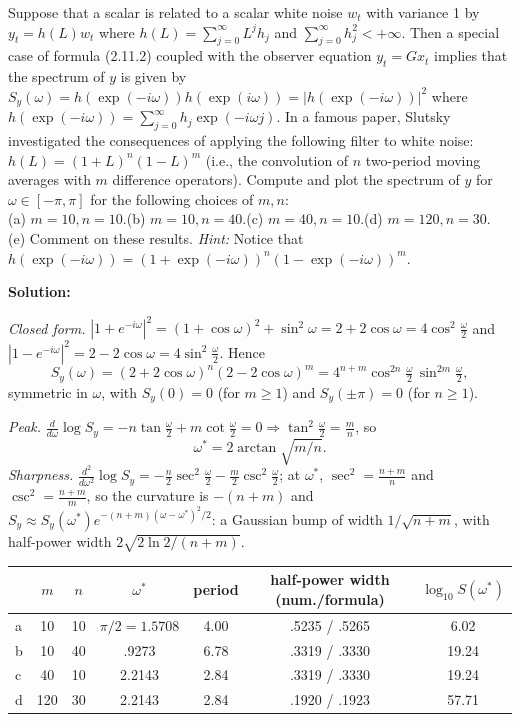 \documentclass[12pt, letterpaper]{article}
\begin{document}
\begin{tcolorbox}[oddbox,title={Exercise 2.15 \quad The Slutsky Effect}]
\begin{tcolorbox}[questionbox]
Suppose that a scalar is related to a scalar white noise $w_t$ with variance 1 by $y_t=h(L)w_t$
where $h(L)=\sum_{j=0}^\infty L^jh_j$ and $\sum_{j=0}^\infty h_j^2<+\infty$. Then a special case of
formula (2.11.2) coupled with the observer equation $y_t=Gx_t$ implies that the spectrum of $y$ is
given by $S_y(\omega)=h(\exp(-i\omega))h(\exp(i\omega))=|h(\exp(-i\omega))|^2$ where
$h(\exp(-i\omega))=\sum_{j=0}^\infty h_j\exp(-i\omega j)$. In a famous paper, Slutsky investigated the
consequences of applying the following filter to white noise: $h(L)=(1+L)^n(1-L)^m$ (i.e., the
convolution of $n$ two-period moving averages with $m$ difference operators). Compute and plot the
spectrum of $y$ for $\omega\in[-\pi,\pi]$ for the following choices of $m,n$:\\[3pt]
(a) $m=10,n=10$.\quad (b) $m=10,n=40$.\quad (c) $m=40,n=10$.\quad (d) $m=120,n=30$.\\
(e) Comment on these results.
\textit{Hint:} Notice that $h(\exp(-i\omega))=(1+\exp(-i\omega))^n(1-\exp(-i\omega))^m$.
\end{tcolorbox}

\textbf{Solution:}

\emph{Closed form.} $|1+e^{-i\omega}|^2=(1+\cos\omega)^2+\sin^2\omega=2+2\cos\omega=4\cos^2\frac\omega2$ and
$|1-e^{-i\omega}|^2=2-2\cos\omega=4\sin^2\frac\omega2$. Hence
\[
S_y(\omega)=(2+2\cos\omega)^n(2-2\cos\omega)^m=4^{n+m}\cos^{2n}\!\tfrac\omega2\,\sin^{2m}\!\tfrac\omega2,
\]
symmetric in $\omega$, with $S_y(0)=0$ (for $m\ge1$) and $S_y(\pm\pi)=0$ (for $n\ge1$).

\emph{Peak.} $\frac{d}{d\omega}\log S_y=-n\tan\frac\omega2+m\cot\frac\omega2=0\Rightarrow
\tan^2\frac{\omega}{2}=\frac mn$, so
\[
\boxed{\omega^*=2\arctan\sqrt{m/n}}.
\]
\emph{Sharpness.} $\frac{d^2}{d\omega^2}\log S_y=-\frac n2\sec^2\frac\omega2-\frac m2\csc^2\frac\omega2$;
at $\omega^*$, $\sec^2=\frac{n+m}{n}$ and $\csc^2=\frac{n+m}{m}$, so the curvature is $-(n+m)$ and
$S_y\approx S_y(\omega^*)e^{-(n+m)(\omega-\omega^*)^2/2}$: a Gaussian bump of width $1/\sqrt{n+m}$, with
half-power width $2\sqrt{2\ln2/(n+m)}$.

\begin{center}\small
\begin{tabular}{@{}lcccccc@{}}
\toprule
 & $m$ & $n$ & $\omega^*$ & period & half-power width (num./formula) & $\log_{10}S(\omega^*)$\\
\midrule
a & 10 & 10 & $\pi/2=1.5708$ & 4.00 & .5235 / .5265 & 6.02\\
b & 10 & 40 & .9273 & 6.78 & .3319 / .3330 & 19.24\\
c & 40 & 10 & 2.2143 & 2.84 & .3319 / .3330 & 19.24\\
d & 120 & 30 & 2.2143 & 2.84 & .1920 / .1923 & 57.71\\
\bottomrule
\end{tabular}
\end{center}


\end{tcolorbox}
\end{document}
